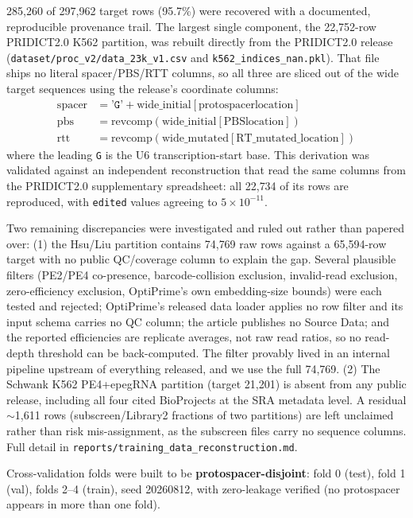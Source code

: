 \documentclass[11pt]{article}
\begin{document}
285{,}260 of 297{,}962 target rows (95.7\%) were recovered with a documented,
reproducible provenance trail. The largest single component, the 22{,}752-row
PRIDICT2.0 K562 partition, was rebuilt directly from the PRIDICT2.0 release
(\texttt{dataset/proc\_v2/data\_23k\_v1.csv} and \texttt{k562\_indices\_nan.pkl}).
That file ships no literal spacer/PBS/RTT columns, so all three are sliced out of
the wide target sequences using the release's coordinate columns:
\[
\begin{aligned}
\text{spacer} &= \texttt{'G'} + \text{wide\_initial}[\text{protospacerlocation}] \\
\text{pbs} &= \text{revcomp}(\text{wide\_initial}[\text{PBSlocation}]) \\
\text{rtt} &= \text{revcomp}(\text{wide\_mutated}[\text{RT\_mutated\_location}])
\end{aligned}
\]
where the leading \texttt{G} is the U6 transcription-start base. This derivation
was validated against an independent reconstruction that read the same columns
from the PRIDICT2.0 supplementary spreadsheet: all 22{,}734 of its rows are
reproduced, with \texttt{edited} values agreeing to $5\times10^{-11}$.

Two remaining discrepancies were investigated and ruled out rather than papered
over: (1) the Hsu/Liu partition contains 74{,}769 raw rows against a 65{,}594-row
target with no public QC/coverage column to explain the gap. Several plausible
filters (PE2/PE4 co-presence, barcode-collision exclusion, invalid-read
exclusion, zero-efficiency exclusion, OptiPrime's own embedding-size bounds)
were each tested and rejected; OptiPrime's released data loader applies no row
filter and its input schema carries no QC column; the article publishes no
Source Data; and the reported efficiencies are replicate averages, not raw read
ratios, so no read-depth threshold can be back-computed. The filter provably
lived in an internal pipeline upstream of everything released, and we use the
full 74{,}769. (2) The Schwank K562 PE4+epegRNA partition (target 21{,}201) is
absent from any public release, including all four cited BioProjects at the SRA
metadata level. A residual $\sim$1{,}611 rows (subscreen/Library2 fractions of
two partitions) are left unclaimed rather than risk mis-assignment, as the
subscreen files carry no sequence columns. Full detail in
\texttt{reports/training\_data\_reconstruction.md}.

Cross-validation folds were built to be \textbf{protospacer-disjoint}: fold 0
(test), fold 1 (val), folds 2--4 (train), seed 20260812, with zero-leakage
verified (no protospacer appears in more than one fold).
\end{document}
